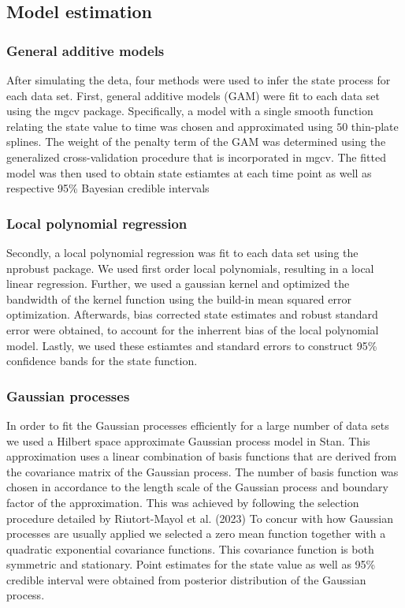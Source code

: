 \subsection{Model estimation}

\subsubsection{General additive models}

After simulating the deta, four methods were used to infer the state process for 
each data set. First, general additive models (GAM) were fit to each data set 
using the mgcv package. Specifically, a model with a single smooth function 
relating the state value to time was chosen and approximated using $50$ 
thin-plate splines. The weight of the penalty term of the GAM was determined 
using the generalized cross-validation procedure that is incorporated in mgcv. 
The fitted model was then used to obtain state estiamtes at each time point as 
well as respective 95\% Bayesian credible intervals 

\subsubsection{Local polynomial regression}

Secondly, a local polynomial regression was fit to each data set using the 
nprobust package. We used first order local polynomials, resulting in a local 
linear regression. Further, we used a gaussian kernel and optimized the bandwidth 
of the kernel function using the build-in mean squared error optimization. Afterwards, 
bias corrected state estimates and robust standard error were obtained, to 
account for the inherrent bias of the local polynomial model. Lastly, we used 
these estiamtes and standard errors to construct 95\% confidence bands for the
state function. 

\subsubsection{Gaussian processes}

In order to fit the Gaussian processes efficiently for a large number of data 
sets we used a Hilbert space approximate Gaussian process model in Stan.
This approximation uses a linear combination of basis functions that are derived 
from the covariance matrix of the Gaussian process. The number of basis 
function was chosen in accordance to the length scale of the 
Gaussian process and boundary factor of the approximation. This was achieved 
by following the selection procedure detailed by Riutort-Mayol et al. (2023) 
To concur with how Gaussian 
processes are usually applied we selected a zero mean function together with a 
quadratic exponential covariance functions. This covariance function is both symmetric and 
stationary. Point estimates for the state value as well as 95\% credible interval 
were obtained from posterior distribution of the Gaussian process. 

